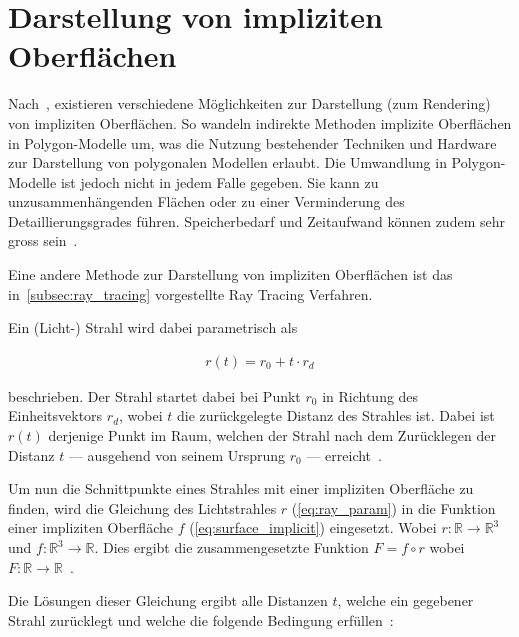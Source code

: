 
\section{Darstellung von impliziten Oberflächen}
\label{sec:description_implicit_surfaces}

Nach~\citeauthor{hart_sphere_1994}, existieren verschiedene
Möglichkeiten zur Darstellung (zum Rendering) von impliziten
Oberflächen. So wandeln indirekte Methoden implizite Oberflächen in
Polygon-Modelle um, was die Nutzung bestehender Techniken und Hardware
zur Darstellung von polygonalen Modellen erlaubt. Die Umwandlung in
Polygon-Modelle ist jedoch nicht in jedem Falle gegeben. Sie kann zu
unzusammenhängenden Flächen oder zu einer Verminderung des
Detaillierungsgrades führen. Speicherbedarf und Zeitaufwand können zudem
sehr gross sein~\parencite[S.  528]{hart_sphere_1994}.

Eine andere Methode zur Darstellung von impliziten Oberflächen ist das
in~\autoref{subsec:ray_tracing} vorgestellte Ray Tracing Verfahren.

Ein (Licht-) Strahl wird dabei parametrisch als

\begin{gather}\label{eq:ray_param}
    r(t) = r_{0} + t \cdot r_{d}
\end{gather}

beschrieben. Der Strahl startet dabei bei Punkt $r_{0}$ in Richtung des
Einheitsvektors $r_{d}$, wobei $t$ die zurückgelegte Distanz des
Strahles ist.  Dabei ist $r(t)$ derjenige Punkt im Raum, welchen der
Strahl nach dem Zurücklegen der Distanz $t$ --- ausgehend von seinem
Ursprung $r_{0}$ --- erreicht~\parencite[S. 528]{hart_sphere_1994}.

Um nun die Schnittpunkte eines Strahles mit einer impliziten Oberfläche
zu finden, wird die Gleichung des Lichtstrahles $r$ (\ref{eq:ray_param})
in die Funktion einer impliziten Oberfläche $f$
(\ref{eq:surface_implicit}) eingesetzt. Wobei $r : \mathbb{R} \to
\mathbb{R}^{3}$ und $f : \mathbb{R}^{3} \to \mathbb{R}$. Dies ergibt die
zusammengesetzte Funktion $F = f \circ r$ wobei $F : \mathbb{R} \to
\mathbb{R}$~\parencite[S. 528]{hart_sphere_1994}.

Die Lösungen dieser Gleichung ergibt alle Distanzen $t$, welche ein
gegebener Strahl zurücklegt und welche die folgende Bedingung
erfüllen~\parencite[S. 528]{hart_sphere_1994}:

